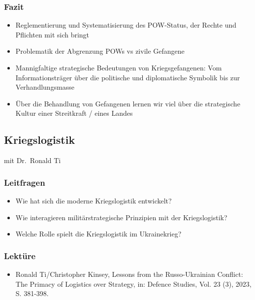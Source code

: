 {}\documentclass[a4paper]{article}
\providecommand{\tightlist}{\setlength{\itemsep}{1mm}\setlength{\parskip}{1mm}}
\begin{document}
\subsubsection{Fazit}\label{fazit-3}

\begin{itemize}
	\tightlist
	\item
	      Reglementierung und Systematisierung des POW-Status, der Rechte und
	      Pflichten mit sich bringt
	\item
	      Problematik der Abgrenzung POWs vs zivile Gefangene
	\item
	      Mannigfaltige strategische Bedeutungen von Kriegsgefangenen: Vom
	      Informationsträger über die politische und diplomatische Symbolik bis
	      zur Verhandlungsmasse
	\item
	      Über die Behandlung von Gefangenen lernen wir viel über die
	      strategische Kultur einer Streitkraft / eines Landes
\end{itemize}

\subsection{Kriegslogistik}\label{kriegslogistik}

mit Dr.~Ronald Ti

\subsubsection{Leitfragen}\label{leitfragen-7}

\begin{itemize}
	\tightlist
	\item
	      Wie hat sich die moderne Kriegslogistik entwickelt?
	\item
	      Wie interagieren militärstrategische Prinzipien mit der
	      Kriegslogistik?
	\item
	      Welche Rolle spielt die Kriegslogistik im Ukrainekrieg?
\end{itemize}

\subsubsection{Lektüre}\label{lektuxfcre-7}

\begin{itemize}
	\tightlist
	\item
	      Ronald Ti/Christopher Kinsey, Lessons from the Russo-Ukrainian
	      Conflict: The Primacy of Logistics over Strategy, in: Defence Studies,
	      Vol. 23 (3), 2023, S. 381-398.
\end{itemize}
\end{document}
